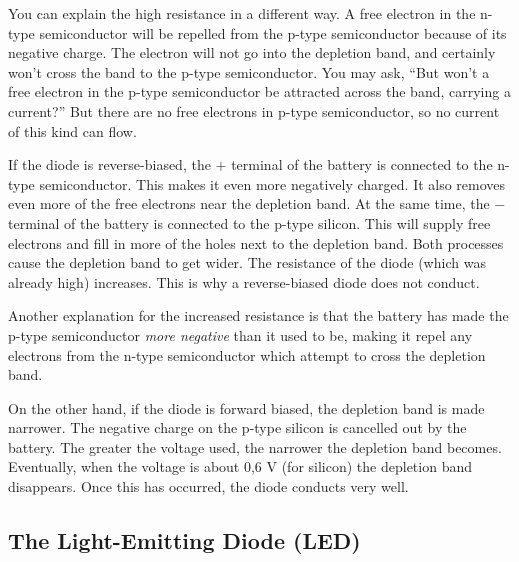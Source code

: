 You can explain the high resistance in a different way.  A free electron in the n-type semiconductor will be repelled from the p-type semiconductor because of its negative charge.  The electron will not go into the depletion band, and certainly won't cross the band to the p-type semiconductor.  You may ask, ``But won't a free electron in the p-type semiconductor be attracted across the band, carrying a current?''  But there are no free electrons in p-type semiconductor, so no current of this kind can flow.

If the diode is reverse-biased, the $+$ terminal of the battery is connected to the n-type semiconductor.  This makes it even more negatively charged.  It also removes even more of the free electrons near the depletion band.  At the same time, the $-$ terminal of the battery is connected to the p-type silicon.  This will supply free electrons and fill in more of the holes next to the depletion band.  Both processes cause the depletion band to get wider.  The resistance of the diode (which was already high) increases.  This is why a reverse-biased diode does not conduct.

Another explanation for the increased resistance is that the battery has made the p-type semiconductor {\it more negative} than it used to be, making it repel any electrons from the n-type semiconductor which attempt to cross the depletion band.

On the other hand, if the diode is forward biased, the depletion band is made narrower.  The negative charge on the p-type silicon is cancelled out by the battery.  The greater the voltage used, the narrower the depletion band becomes.  Eventually, when the voltage is about 0,6 V (for silicon) the depletion band disappears.  Once this has occurred, the diode conducts very well.  




\subsection{The Light-Emitting Diode (LED)}

